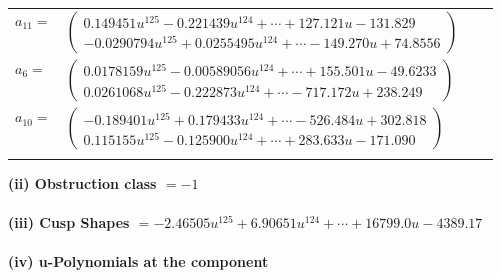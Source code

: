 \documentclass[1p]{elsarticle_modified}
\theoremstyle{definition}
\begin{document}
\begin{tabular}{m{7pt} m{180pt} m{7pt} m{180pt} }
\flushright $a_{11}=$&$\begin{pmatrix}0.149451 u^{125}-0.221439 u^{124}+\cdots+127.121 u-131.829\\-0.0290794 u^{125}+0.0255495 u^{124}+\cdots-149.270 u+74.8556\end{pmatrix}$ \\
\flushright $a_{6}=$&$\begin{pmatrix}0.0178159 u^{125}-0.00589056 u^{124}+\cdots+155.501 u-49.6233\\0.0261068 u^{125}-0.222873 u^{124}+\cdots-717.172 u+238.249\end{pmatrix}$ \\
\flushright $a_{10}=$&$\begin{pmatrix}-0.189401 u^{125}+0.179433 u^{124}+\cdots-526.484 u+302.818\\0.115155 u^{125}-0.125900 u^{124}+\cdots+283.633 u-171.090\end{pmatrix}$\\&\end{tabular}
\flushleft \textbf{(ii) Obstruction class $= -1$}\\~\\
\flushleft \textbf{(iii) Cusp Shapes $= -2.46505 u^{125}+6.90651 u^{124}+\cdots+16799.0 u-4389.17$}\\~\\
\newpage\renewcommand{\arraystretch}{1}
\flushleft \textbf{(iv) u-Polynomials at the component}\newline \\
\end{document}

